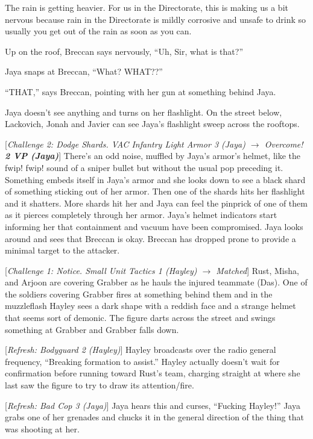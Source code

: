 The rain is getting heavier.  For us in the Directorate, this is making us a bit nervous because rain in the Directorate is mildly corrosive and unsafe to drink so usually you get out of the rain as soon as you can.

Up on the roof, Breccan says nervously, ``Uh, Sir, what is that?''

Jaya snaps at Breccan, ``What?  WHAT??''

``THAT,'' says Breccan, pointing with her gun at something behind Jaya.

Jaya doesn't see anything and turns on her flashlight.  On the street below, Lackovich, Jonah and Javier can see Jaya's flashlight sweep across the rooftops.

{[}\textit{Challenge 2: Dodge Shards.  VAC Infantry Light Armor 3 (Jaya) $\rightarrow$ Overcome! }\textit{\textbf{2 VP (Jaya)}}{]} There's an odd noise, muffled by Jaya's armor's helmet, like the fwip! fwip! sound of a sniper bullet but without the usual pop preceding it.  Something embeds itself in Jaya's armor and she looks down to see a black shard of something sticking out of her armor.  Then one of the shards hits her flashlight and it shatters.  More shards hit her and Jaya can feel the pinprick of one of them as it pierces completely through her armor.  Jaya's helmet indicators start informing her that containment and vacuum have been compromised.  Jaya looks around and sees that Breccan is okay.  Breccan has dropped prone to provide a minimal target to the attacker.



{[}\textit{Challenge 1: Notice.  Small Unit Tactics 1 (Hayley) $\rightarrow$ Matched}{]}   Rust, Misha, and Arjoon are covering Grabber as he hauls the injured teammate (Das).  One of the soldiers covering Grabber fires at something behind them and in the muzzleflash Hayley sees a dark shape with a reddish face and a strange helmet that seems sort of demonic.  The figure darts across the street and swings something at Grabber and Grabber falls down.



{[}\textit{Refresh: Bodyguard 2 (Hayley)}{]} Hayley broadcasts over the radio general frequency, ``Breaking formation to assist.''  Hayley actually doesn't wait for confirmation before running toward Rust's team, charging straight at where she last saw the figure to try to draw its attention/fire.



{[}\textit{Refresh: Bad Cop 3 (Jaya)}{]} Jaya hears this and curses, ``Fucking Hayley!''  Jaya grabs one of her grenades and chucks it in the general direction of the thing that was shooting at her.



